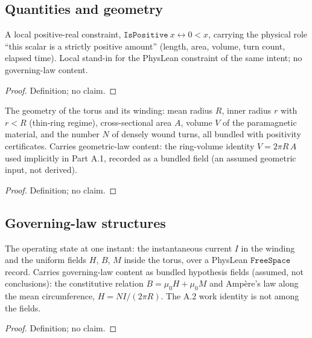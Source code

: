 \subsection*{Quantities and geometry}

\begin{definition}
\label{def:IPhO2026Problems_problem_IPhO_2026_3_A_2:IsPositive}
A local positive-real constraint, $\mathtt{IsPositive}\ x \leftrightarrow 0 < x$,
carrying the physical role ``this scalar is a strictly positive amount''
(length, area, volume, turn count, elapsed time).  Local stand-in for the
PhysLean constraint of the same intent; no governing-law content.
\end{definition}
\begin{proof}
Definition; no claim.
\end{proof}

\begin{definition}
\label{def:IPhO2026Problems_problem_IPhO_2026_3_A_2:ToroidData}
The geometry of the torus and its winding: mean radius $R$, inner radius $r$
with $r < R$ (thin-ring regime), cross-sectional area $A$, volume $V$ of the
paramagnetic material, and the number $N$ of densely wound turns, all bundled
with positivity certificates.  Carries geometric-law content: the ring-volume
identity $V = 2\pi R\,A$ used implicitly in Part A.1, recorded as a bundled
field (an assumed geometric input, not derived).
\end{definition}
\begin{proof}
Definition; no claim.
\end{proof}

\subsection*{Governing-law structures}

\begin{definition}
\label{def:IPhO2026Problems_problem_IPhO_2026_3_A_2:UniformToroidOperatingPoint}
The operating state at one instant: the instantaneous current $I$ in the
winding and the uniform fields $H$, $B$, $M$ inside the torus, over a PhysLean
$\mathtt{FreeSpace}$ record.  Carries governing-law content as bundled
hypothesis fields (assumed, not conclusions): the constitutive relation
$B = \mu_0 H + \mu_0 M$ and Ampère's law along the mean circumference,
$H = N I/(2\pi R)$.  The A.2 work identity is not among the fields.
\end{definition}
\begin{proof}
Definition; no claim.
\end{proof}

